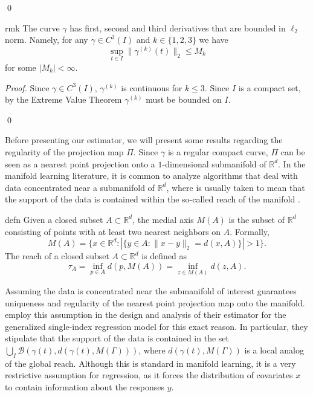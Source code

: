 \documentclass[11pt]{article}
\begin{document}
\qed{}


\begin{restatable}{rmk}{} \label{remark: deriv bound}
    The curve $\gamma$ has first, second and third derivatives that are bounded in $\ell_2$ norm. Namely, for any $\gamma \in C^3(I)$ and $k \in \{1,2,3\}$ we have 
    \[\sup_{t\in I}\|\gamma^{(k)}(t)\|_2 \leq M_k\]
    for some $|M_k| < \infty$.
\end{restatable}
\noindent \textit{Proof.} Since $\gamma \in C^3(I)$, $\gamma^{(k)}$ is continuous for $k \leq 3$. Since $I$ is a compact set, by the Extreme Value Theorem $\gamma^{(k)}$ must be bounded on $I$. 

\qed{}



Before presenting our estimator, we will present some results regarding the regularity of the projection map $\Pi$. Since $\gamma$ is a regular compact curve, $\Pi$ can be seen as a nearest point projection onto a $1$-dimensional submanifold of $\mathbb{R}^d$. In the manifold learning literature, it is common to analyze algorithms that deal with data concentrated near a submanifold of $\mathbb{R}^d$, where  is usually taken to mean that the support of the data is contained within the so-called reach of the manifold \cite{genovese2012minimax, balakrishnan2012minimax, kokotnoisy, saidi2024recovering}.

\begin{restatable}{defn}{}
    Given a closed subset $A \subset \mathbb{R}^d$, the medial axis $M(A)$ is the subset of $\mathbb{R}^d$ consisting of points with at least two nearest neighbors on $A$. Formally,
    \begin{equation}
    M(A) = \{x \in \mathbb{R}^d : |\{y \in A : \|x-y\|_2 = d(x,A)\}| > 1\}. \label{eq: medial axis definition}
    \end{equation}
    The reach of a closed subset $A \subset \mathbb{R}^d$ is defined as 
    \begin{equation}
        \tau_A = \inf_{p\in A} d(p,M(A)) = \inf_{z\in M(A)}d(z,A). \label{eq: reach definition}
    \end{equation}
\end{restatable}

Assuming the data is concentrated near the submanifold of interest guarantees uniqueness and regularity of the nearest point projection map onto the manifold. \citet{wu2024conditional} employ this assumption in the design and analysis of their estimator for the generalized single-index regression model for this exact reason. In particular, they stipulate that the support of the data is contained in the set $\bigcup_{I}\mathcal{B}(\gamma(t), d(\gamma(t), M(\Gamma)))$, where $d(\gamma(t), M(\Gamma))$ is a local analog of the global reach. Although this is standard in manifold learning, it is a very restrictive assumption for regression, as it forces the distribution of covariates $x$ to contain information about the responses $y$. 
\end{document}
